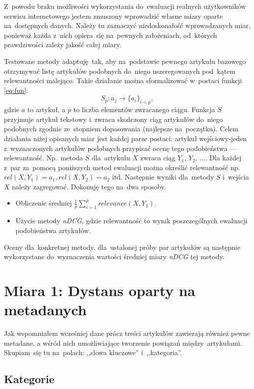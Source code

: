 \documentclass[pl]{minipw} %
\begin{document}
Z~powodu braku możliwości wykorzystania do~ewaluacji realnych użytkowników serwisu internetowego jestem zmuszony wprowadzić własne miary oparte na~dostępnych danych. Należy tu zaznaczyć niedoskonałość wprowadzanych miar, ponieważ każda z~nich opiera~się na~pewnych założeniach, od~których prawdziwości zależy jakość całej miary.

Testowane metody adaptuję tak, aby na~podstawie pewnego artykułu bazowego otrzymywać listę artykułów podobnych do~niego uszeregowanych pod~kątem relewantności malejąco. Takie działanie można sformalizować w~postaci funkcji \ref{eq:fun}:
\begin{equation}
\label{eq:fun}
S_p: a_j \to \{a_{i}\}_{i < p},
\end{equation}
gdzie $a$ to artykuł, a $p$ to liczba elementów zwracanego ciągu. Funkcja $S$ przyjmuje artykuł tekstowy i~zwraca skończony ciąg artykułów do~niego podobnych zgodnie ze~stopniem dopasowania (najlepsze na~początku). Celem działania niżej opisanych miar jest każdej parze postaci: artykuł wejściowy-jeden z~wyznaczonych artykułów podobnych przypisać ocenę tego podobieństwa --- relewantność. Np.~metoda $S$ dla~artykułu $X$ zwraca ciąg {$Y_1$, $Y_2$, ...}. Dla każdej z~par za~pomocą poniższych metod ewaluacji można określić relewantność np.~$rel(X, Y_1) = a_1, rel(X, Y_2) = a_2$ itd. Następnie wyniki dla~metody $S$ i~wejścia $X$ należy zagregować. Dokonuję tego na~dwa sposoby.
\begin{itemize}
	\item Obliczenie średniej $\frac{1}{p}\sum_{i=1}^{p}relevance(X,Y_1)$.
	\item Użycie metody \textit{nDCG}, gdzie relewantność to wynik poszczególnych ewaluacji podobieństwa artykułów.
\end{itemize}  

Oceny dla~konkretnej metody, dla~ustalonej próby par artykułów są następnie wykorzystane do~wyznaczenia wartości średniej miary \textit{nDCG} tej metody.

\section{Miara 1: Dystans oparty na metadanych}

Jak wspomniałem wcześniej dane prócz treści artykułów zawierają również pewne metadane, a wśród nich umożliwiające tworzenie powiązań między~artykułami. Skupiam~się tu na~polach: ,,słowa kluczowe'' i~,,kategoria''.

\subsection{Kategorie} 
\end{document}
